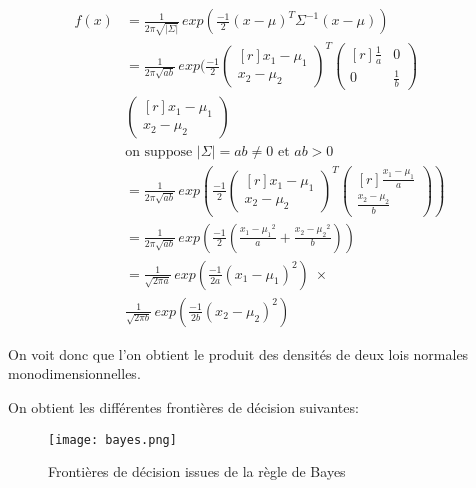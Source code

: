 \documentclass{article}
\begin{document}
\begin{multicols}{2}
\begin{equation}
    \begin{split}
        f(x) &= \frac{1}{2 \pi \sqrt{|\Sigma|}} \, exp(\frac{-1}{2}(x - \mu)^{T} \Sigma^{-1} (x - \mu)) \\
        &= \frac{1}{2 \pi \sqrt{ab}} \, exp(\frac{-1}{2} \begin{pmatrix*}[r]
            x_1 - \mu_1 \\
            x_2 - \mu_2
        \end{pmatrix*}^{T} \begin{pmatrix*}[r]
            \frac{1}{a} & 0 \\
            0 & \frac{1}{b}
        \end{pmatrix*} \\
        & \begin{pmatrix*}[r]
            x_1 - \mu_1 \\
            x_2 - \mu_2
          \end{pmatrix*} \\
        & \text{on suppose } |\Sigma| = ab \neq 0 \text{ et } ab > 0 \\
        &= \frac{1}{2 \pi \sqrt{ab}} \, exp(\frac{-1}{2} \begin{pmatrix*}[r]
            x_1 - \mu_1 \\
            x_2 - \mu_2
        \end{pmatrix*}^{T} \begin{pmatrix*}[r]
            \frac{x_1 - \mu_1}{a} \\
            \frac{x_2 - \mu_2}{b}
        \end{pmatrix*}) \\
        &= \frac{1}{2 \pi \sqrt{ab}} \, exp(\frac{-1}{2} (\frac{{x_1 - \mu_1}^{2}}{a} + \frac{{x_2 - \mu_2}^{2}}{b})) \\
        &= \frac{1}{\sqrt{2 \pi a}} \, exp(\frac{-1}{2 a} (x_1 - \mu_1)^{2}) \; \times \\
        &  \frac{1}{\sqrt{2 \pi b}} \, exp(\frac{-1}{2 b} (x_2 - \mu_2)^{2})
    \end{split}
\end{equation}

On voit donc que l'on obtient le produit des densités de deux lois normales
monodimensionnelles.

On obtient les différentes frontières de décision suivantes:

\begin{figure}[H]
    \begin{center}
        \texttt{[image: bayes.png]}
        \centering
        \captionsetup{justification=centering}
        \caption{\label{fig:bayes}Frontières de décision issues de la règle de Bayes}
    \end{center}
\end{figure}


\end{multicols}
\end{document}
